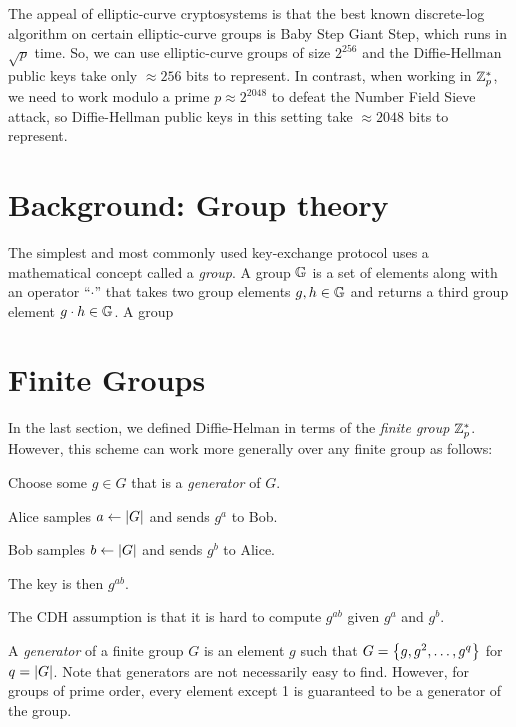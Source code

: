 The appeal of elliptic-curve cryptosystems is that the best known discrete-log
algorithm on certain elliptic-curve groups is Baby Step Giant Step, which runs
in $\sqrt p$ time.
So, we can use elliptic-curve groups of size $2^{256}$ and the Diffie-Hellman
public keys take only $\approx 256$ bits to represent.
In contrast, when working in $\mathbb{Z}^*_p$, we need to work modulo a prime $p \approx 2^{2048}$
to defeat the Number Field Sieve attack, so Diffie-Hellman public keys in
this setting take $\approx 2048$ bits to represent.



\iffalse
\section{Background: Group theory}
The simplest and most commonly used key-exchange protocol uses
a mathematical concept called a \emph{group}.
A group $\mathbb{G}$ is a set of elements along with an operator
``$\cdot$'' that takes two group elements $g, h \in \mathbb{G}$
and returns a third group element $g \cdot h \in \mathbb{G}$.
A group 


\section{Finite Groups}
In the last section, we defined Diffie-Helman in terms of the \emph{finite group} $\mathbb{Z}_p^*$. However, this scheme can work more generally over any finite group as follows:

\begin{compactenum}
	\item Choose some $g \in G$ that is a \emph{generator} of $G$.
	\item Alice samples $a \gets \left| G \right|$ and sends $g^a$ to Bob.
	\item Bob samples $b \gets \left| G \right|$ and sends $g^b$ to Alice.
	\item The key is then $g^{ab}$.
\end{compactenum}

The CDH assumption is that it is hard to compute $g^{ab}$ given $g^a$ and $g^b$.

\begin{definition}
	A \emph{generator} of a finite group $G$ is an element $g$ such that $G = \left\{ g, g^2, \ldots, g^q \right\}$ for $q = \left| G \right|$. Note that generators are not necessarily easy to find. However, for groups of prime order, every element except 1 is guaranteed to be a generator of the group.
\end{definition}

